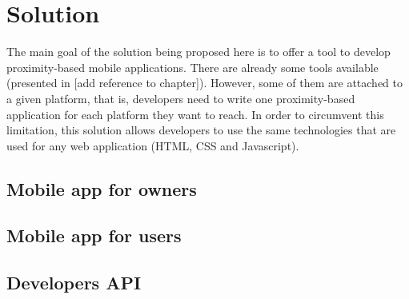 
\chapter{Solution}
\label{chapter:solution}
The main goal of the solution being proposed here is to offer a tool
to develop proximity-based mobile applications.
There are already some tools available (presented in [add reference to chapter]).
However, some of them are attached to a given platform, that is, developers
need to write one proximity-based application for each platform they want
to reach.
In order to circumvent this limitation, this solution allows developers
to use the same technologies that are used for any web application (HTML, CSS
and Javascript).

\section{Mobile app for owners}
\label{sec:mobile_app_for_owners}

\section{Mobile app for users}
\label{sec:mobile_app_for_users}

\section{Developers API}
\label{sec:developers_api}
